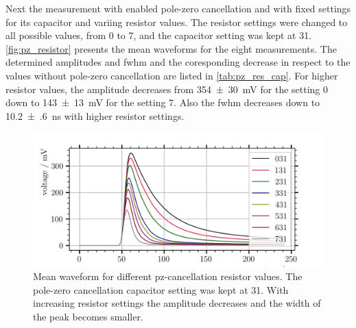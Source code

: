 Next the measurement with enabled pole-zero cancellation and with fixed settings for its capacitor and variing resistor values.
The resistor settings were changed to all possible values, from 0 to 7, and the capacitor setting was kept at 31.
\autoref{fig:pz_resistor} presents the mean waveforms for the eight measurements.
The determined amplitudes and \ac{fwhm} and the coresponding decrease in respect to the values without pole-zero cancellation are listed in \autoref{tab:pz_res_cap}.
For higher resistor values, the amplitude decreases from \SI{354(30)}{\milli\volt} for the setting 0 down to \SI{143(13)}{\milli\volt} for the setting 7.
Also the \ac{fwhm} decreases down to \SI{10.2(6)}{\nano\second} with higher resistor settings.



\begin{figure}
	\centering
	\includegraphics[width=1.\textwidth]{pictures/pz_resistor}
	\caption[Mean waveform for different pz-cancellation resistor values.]{Mean waveform for different pz-cancellation resistor values. The pole-zero cancellation capacitor setting was kept at 31. With increasing resistor settings the amplitude decreases and the width of the peak becomes smaller.}
	\label{fig:pz_resistor}
\end{figure}

